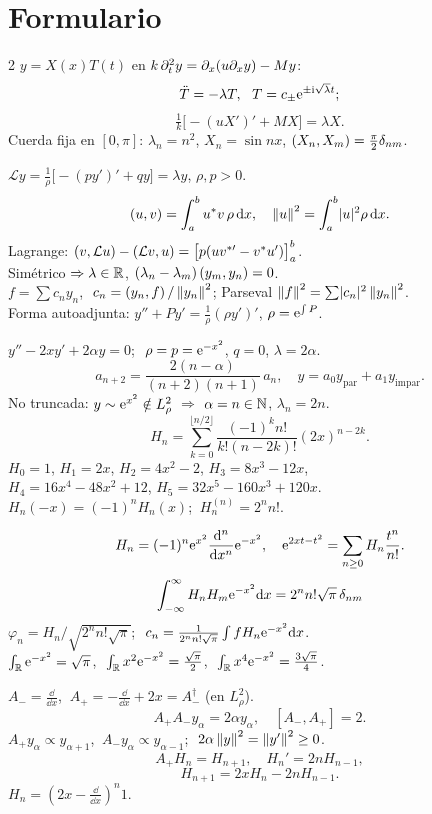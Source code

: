 \documentclass[11pt,a4paper,twoside]{article}
\newcommand{\Lop}{\mathcal{L}}
\newcommand{\Ap}{A_{+}}
\newcommand{\Am}{A_{-}}
\begin{document}
\section{Formulario}
{\footnotesize
\setlength{\columnsep}{1.4em}
\setlength{\parskip}{0.35ex}
\begin{multicols}{2}
 $y=X(x)T(t)$ en $k\,\partial_t^2y=\partial_x(u\partial_xy)-My$:
\[\ddot T=-\lambda T,\ \ T=c_\pm\e^{\pm\iu\sqrt\lambda t};\]\[\tfrac1k\bigl[-(uX')'+MX\bigr]=\lambda X.\]
Cuerda fija en $[0,\pi]$: $\lambda_n=n^2$, $X_n=\sin nx$, $\left(X_n,X_m\right)=\frac\pi2\delta_{nm}$.

 $\Lop y=\frac1\rho\bigl[-(py')'+qy\bigr]=\lambda y$, $\rho,p>0$.
\[\left(u,v\right)=\int_a^bu^*v\,\rho\,\mathrm{d} x,\quad \left\lVert u\right\rVert^2=\int_a^b\lvert u\rvert^2\rho\,\mathrm{d} x .\]
Lagrange: $\ip{v}{\Lop u}-\ip{\Lop v}{u}=\bigl[p(uv^{*\prime}-v^*u')\bigr]_a^b$.\\
Simétrico $\Rightarrow\lambda\in\mathbb{R}$, $(\lambda_n-\lambda_m)\left(y_m,y_n\right)=0$.\\
$f=\sum c_ny_n$, $\ c_n=\left(y_n,f\right)/\left\lVert y_n\right\rVert^2$; Parseval $\left\lVert f\right\rVert^2=\sum\lvert c_n\rvert^2\left\lVert y_n\right\rVert^2$.\\
Forma autoadjunta: $y''+Py'=\frac1\rho(\rho y')'$, $\rho=\mathrm{e}^{\int P}$.

 $y''-2xy'+2\alpha y=0$; $\ \rho=p=\mathrm{e}^{-x^2}$, $q=0$, $\lambda=2\alpha$.
\[a_{n+2}=\frac{2(n-\alpha)}{(n+2)(n+1)}\,a_n,\quad y=a_0y_{\mathrm{par}}+a_1y_{\mathrm{impar}}.\]
No truncada: $y\sim\mathrm{e}^{x^2}\notin L^2_\rho$ $\Rightarrow$ $\alpha=n\in\mathbb{N}$, $\lambda_n=2n$.
\[H_n=\sum_{k=0}^{\lfloor n/2\rfloor}\frac{(-1)^kn!}{k!(n-2k)!}(2x)^{n-2k}.\]
$H_0=1$, $H_1=2x$, $H_2=4x^2-2$, $H_3=8x^3-12x$,\\
$H_4=16x^4-48x^2+12$, $H_5=32x^5-160x^3+120x$.\\
$H_n(-x)=(-1)^nH_n(x)$; $\ H_n^{(n)}=2^nn!$.

\[H_n=(-1)^n\mathrm{e}^{x^2}\frac{\mathrm{d}^n}{\mathrm{d} x^n}\mathrm{e}^{-x^2},\quad \mathrm{e}^{2xt-t^2}=\sum_{n\ge0}H_n\frac{t^n}{n!}.\]
\[\int_{-\infty}^\infty H_nH_m\mathrm{e}^{-x^2}\mathrm{d} x=2^nn!\sqrt\pi\,\delta_{nm}\]
$\varphi_n=H_n/\sqrt{2^nn!\sqrt\pi}$; $\ c_n=\frac{1}{2^nn!\sqrt\pi}\int fH_n\mathrm{e}^{-x^2}\mathrm{d} x$.\\
$\int_{\mathbb{R}}\mathrm{e}^{-x^2}=\sqrt\pi$, $\ \int_{\mathbb{R}} x^2\mathrm{e}^{-x^2}=\frac{\sqrt\pi}2$, $\ \int_{\mathbb{R}} x^4\mathrm{e}^{-x^2}=\frac{3\sqrt\pi}4$.

 $\Am=\frac{\dd}{\dd x}$, $\ \Ap=-\frac{\dd}{\dd x}+2x=\Am^\dagger$ (en $L^2_\rho$).
\[\Ap\Am y_\alpha=2\alpha y_\alpha,\quad[\Am,\Ap]=2.\]
$\Ap y_\alpha\propto y_{\alpha+1}$, $\ \Am y_\alpha\propto y_{\alpha-1}$; $\ 2\alpha\left\lVert y\right\rVert^2=\left\lVert y'\right\rVert^2\ge0$.
\[\Ap H_n=H_{n+1},\quad H_n'=2nH_{n-1},\]\[H_{n+1}=2xH_n-2nH_{n-1}.\]
$H_n=(2x-\frac{\dd}{\dd x})^n1$.


\end{multicols}}
\end{document}
